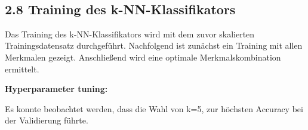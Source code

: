 \documentclass[11pt]{article}
\begin{document}
    \begin{center}
    \end{center}
    { \hspace*{\fill} \\}
    
    \hypertarget{training-des-k-nn-klassifikators}{%
\subsection*{2.8 Training des
k-NN-Klassifikators}\label{training-des-k-nn-klassifikators}}

    Das Training des k-NN-Klassifikators wird mit dem zuvor skalierten
Trainingsdatensatz durchgeführt. Nachfolgend ist zunächst ein Training
mit allen Merkmalen gezeigt. Anschließend wird eine optimale
Merkmalskombination ermittelt.

\textbf{Hyperparameter tuning:}

Es konnte beobachtet werden, dass die Wahl von k=5, zur höchsten
Accuracy bei der Validierung führte.
\end{document}
